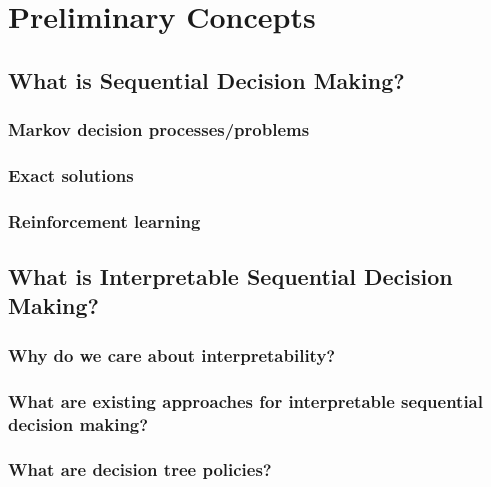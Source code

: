 \chapter*{Preliminary Concepts}
\section{What is Sequential Decision Making?}
\subsection{Markov decision processes/problems}
\subsection{Exact solutions}
\subsection{Reinforcement learning}
\section{What is Interpretable Sequential Decision Making?}
\subsection{Why do we care about interpretability?}
\subsection{What are existing approaches for interpretable sequential decision making?}
\subsection{What are decision tree policies?}

